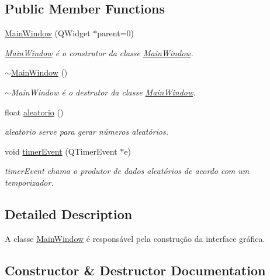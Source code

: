 \subsection*{Public Member Functions}
\begin{DoxyCompactItemize}
\item 
\mbox{\label{class_main_window_a8b244be8b7b7db1b08de2a2acb9409db}} 
\mbox{\hyperlink{class_main_window_a8b244be8b7b7db1b08de2a2acb9409db}{Main\+Window}} (Q\+Widget $\ast$parent=0)
\begin{DoxyCompactList}\small\item\em \mbox{\hyperlink{class_main_window}{Main\+Window}} é o construtor da classe \mbox{\hyperlink{class_main_window}{Main\+Window}}. \end{DoxyCompactList}\item 
\mbox{\hyperlink{class_main_window_ae98d00a93bc118200eeef9f9bba1dba7}{$\sim$\+Main\+Window}} ()
\begin{DoxyCompactList}\small\item\em $\sim$\+Main\+Window é o destrutor da classe \mbox{\hyperlink{class_main_window}{Main\+Window}}. \end{DoxyCompactList}\item 
float \mbox{\hyperlink{class_main_window_ab29e2b2ee8118c9d36c45820309a9093}{aleatorio}} ()
\begin{DoxyCompactList}\small\item\em aleatorio serve para gerar números aleatórios. \end{DoxyCompactList}\item 
void \mbox{\hyperlink{class_main_window_a9d08a694a5f9c532225754381b8011ea}{timer\+Event}} (Q\+Timer\+Event $\ast$e)
\begin{DoxyCompactList}\small\item\em timer\+Event chama o produtor de dados aleatórios de acordo com um temporizador. \end{DoxyCompactList}\end{DoxyCompactItemize}


\subsection{Detailed Description}
A classe \mbox{\hyperlink{class_main_window}{Main\+Window}} é responsável pela construção da interface gráfica. 

\subsection{Constructor \& Destructor Documentation}
\mbox{\label{class_main_window_ae98d00a93bc118200eeef9f9bba1dba7}} 
